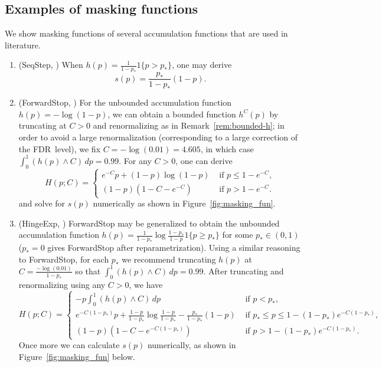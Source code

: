 \documentclass{biometrika}
\newcommand{\textFDR}{FDR}
\newcommand{\pth}{p_{*}}
\newcommand{\1}{\mathbf{1}}
\begin{document}
\subsection{Examples of masking functions}\label{subapp:masking_functions}
We show masking functions of several accumulation functions that are used in literature.
\begin{enumerate}
\item (SeqStep, \cite{barber15}) When $h(p) = \frac{1}{1-\pth} 1\{ p > \pth\}$, one may derive
\[s(p) = \frac{\pth}{1-\pth}(1 - p).\]
\item (ForwardStop, \cite{gsell2016sequential}) For the unbounded accumulation function $h(p) = -\log(1 - p)$, we can obtain a bounded function $h^C(p)$ by truncating at $C>0$ and renormalizing as in Remark~\ref{rem:bounded-h}; in order to avoid a large renormalization (corresponding to a large correction of the \textFDR ~level), we fix $C = -\log(0.01) = 4.605$, in which case $\int_0^1(h(p)\wedge C)\,dp = 0.99$. For any $C>0$, one can derive
\[H(p; C) = \left\{
    \begin{array}{ll}
      e^{-C}p + (1 - p)\log (1 - p) & \text{ if } p\le 1 - e^{-C},\\
      (1 - p)(1 - C - e^{-C}) & \text{ if } p > 1 - e^{-C}.
    \end{array}
\right.\]
  and solve for $s(p)$ numerically as shown in Figure~\ref{fig:masking_fun}.

\item (HingeExp, \cite{li2016accumulation}) ForwardStop may be generalized to obtain the unbounded accumulation function $h(p) = \frac{1}{1 - \pth}\log \frac{1 - \pth}{1 - p}1\{p\ge \pth\}$ for some $\pth\in (0, 1)$ ($\pth=0$ gives ForwardStop after reparametrization).
Using a similar reasoning to ForwardStop, for each $\pth$ we recommend truncating $h(p)$ at $C = \frac{-\log (0.01)}{1 - \pth}$ so that $\int_0^1(h(p)\wedge C)\,dp = 0.99$.
After truncating and renormalizing using any $C>0$, we have
\[
H(p; C) = \left\{
    \begin{array}{ll}
      -p\int_0^1(h(p)\wedge C)\,dp & \text{ if } p < \pth,\\
      e^{-C(1-\pth)}p + \frac{1-p}{1-\pth}\log\frac{1-p}{1-\pth} - \frac{\pth}{1-\pth}(1-p) & \text{ if } \pth\le p\le 1 - (1 - \pth)e^{-C(1 - \pth)},\\
      (1 - p)(1 - C - e^{-C(1-\pth)}) & \text{ if } p > 1 - (1 - \pth)e^{-C(1 - \pth)}.
    \end{array}
\right.
\]
Once more we can calculate $s(p)$ numerically, as shown in Figure~\ref{fig:masking_fun} below.
\end{enumerate}
\end{document}
